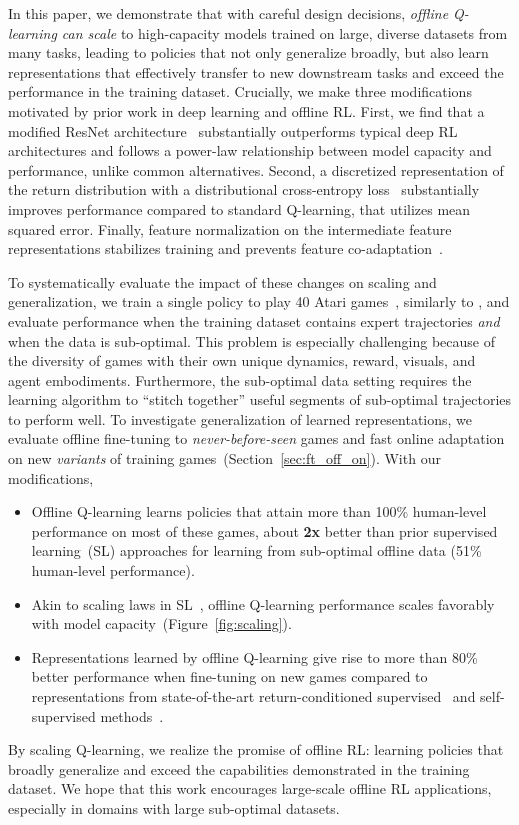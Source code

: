 In this paper, we demonstrate that with careful design decisions, \emph{offline Q-learning can scale} to high-capacity models trained on large, diverse datasets from many tasks, leading to policies that not only generalize broadly, but also learn representations that effectively transfer to new downstream tasks and exceed  the performance in the training dataset. 
Crucially, we make three modifications motivated by prior work in deep learning and offline RL. First, we find that a modified ResNet architecture~\citep{resnet} substantially outperforms typical deep RL architectures and follows a power-law relationship between model capacity and performance, unlike common alternatives. 
Second, a discretized representation of the return distribution with a distributional cross-entropy loss~\citep{bellemare2017distributional}  substantially improves performance compared to standard Q-learning, that utilizes mean squared error. Finally, feature normalization on the intermediate feature representations stabilizes training and prevents feature co-adaptation~\citep{kumar2021dr3}. 


To systematically evaluate the impact of these changes on scaling and generalization, we train a single policy to play 40 Atari games~\citep{bellemare2013arcade, agarwal2019optimistic}, similarly to \citet{lee2022multi}, and evaluate performance when the training dataset contains expert trajectories \emph{and} when the data is sub-optimal. This problem is especially challenging because of the diversity of games with their own unique dynamics, reward, visuals, and agent embodiments. Furthermore, the sub-optimal data setting requires the learning algorithm to ``stitch together'' useful segments of sub-optimal trajectories to perform well. 
To investigate generalization of learned representations, we evaluate offline fine-tuning to \emph{never-before-seen} games and fast online adaptation on new \emph{variants} of training games~(Section~\ref{sec:ft_off_on}).
With our modifications, 
\begin{itemize}
    \item Offline Q-learning learns policies that attain more than 100\% human-level performance on most of these games, about \textbf{2x} better than prior supervised learning~(SL) approaches for learning from sub-optimal offline data (51\% human-level performance). 
    \item Akin to scaling laws in SL~\citep{kaplan2020scaling}, offline Q-learning performance scales favorably with model capacity~(Figure~\ref{fig:scaling}). 
    \item Representations learned by offline Q-learning give rise to more than 80\% better performance when fine-tuning on new games compared to representations from state-of-the-art return-conditioned supervised~\citep{lee2022multi} and self-supervised methods~\citep{he2111masked,oord2018representation}. 
\end{itemize}
By scaling Q-learning, we realize the promise of offline RL: learning policies that broadly generalize and exceed the capabilities demonstrated in the training dataset. We hope that this work encourages large-scale offline RL applications, especially in domains with large sub-optimal datasets.

